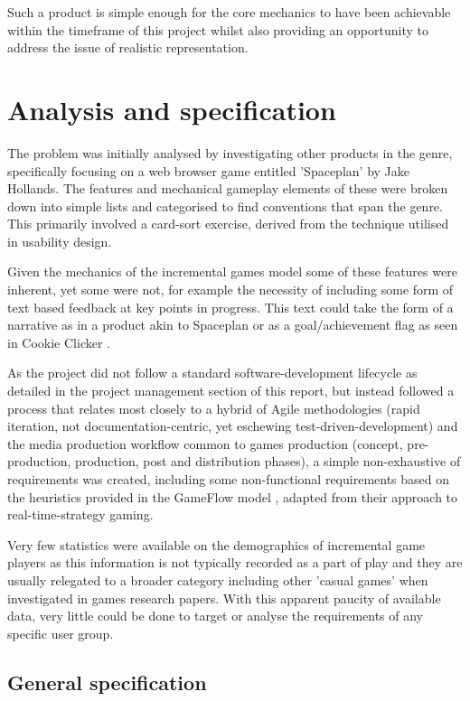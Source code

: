 \documentclass[twoside]{bhamthesis}
\begin{document}
Such a product is simple enough for the core mechanics to have been achievable within the timeframe of this project whilst also providing an opportunity to address the issue of realistic representation.



\section{Analysis and specification}

The problem was initially analysed by investigating other products in the genre, specifically focusing on a web browser game entitled 'Spaceplan' by Jake Hollands. The features and mechanical gameplay elements of these were broken down into simple lists and categorised to find conventions that span the genre. This primarily involved a card-sort exercise, derived from the technique utilised in usability design.

Given the mechanics of the incremental games model some of these features were inherent, yet some were not, for example the necessity of including some form of text based feedback at key points in progress. This text could take the form of a narrative as in a product akin to Spaceplan \cite{hollands_spaceplan_2017} or as a goal/achievement flag as seen in Cookie Clicker \cite{ortiel_cookie_2017}.

As the project did not follow a standard software-development lifecycle as detailed in the project management section of this report, but instead followed a process that relates most closely to a hybrid of Agile methodologies (rapid iteration, not documentation-centric, yet eschewing test-driven-development) and the media production workflow common to games production (concept, pre-production, production, post and distribution phases), a simple non-exhaustive of requirements was created, including some non-functional requirements based on the heuristics provided in the GameFlow model \cite{sweetser_gameflow_2012}, adapted from their approach to real-time-strategy gaming.

Very few statistics were available on the demographics of incremental game players as this information is not typically recorded as a part of play and they are usually relegated to a broader category including other 'casual games' when investigated in games research papers. With this apparent paucity of available data, very little could be done to target or analyse the requirements of any specific user group.

\subsection{General specification}
\end{document}
